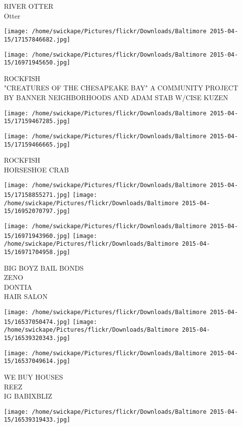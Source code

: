\documentclass[10pt,letterpaper]{article}
\begin{document}
RIVER OTTER\\
Otter
\pagebreak

\texttt{[image: /home/swickape/Pictures/flickr/Downloads/Baltimore 2015-04-15/17157846682.jpg]}

\vspace{0.25in}
\texttt{[image: /home/swickape/Pictures/flickr/Downloads/Baltimore 2015-04-15/16971945650.jpg]}

ROCKFISH\\
"CREATURES OF THE CHESAPEAKE BAY" A COMMUNITY PROJECT BY BANNER NEIGHBORHOODS AND ADAM STAB W/CISE KUZEN
\pagebreak

\texttt{[image: /home/swickape/Pictures/flickr/Downloads/Baltimore 2015-04-15/17159467285.jpg]}

\vspace{0.25in}
\texttt{[image: /home/swickape/Pictures/flickr/Downloads/Baltimore 2015-04-15/17159466665.jpg]}

ROCKFISH\\
HORSESHOE CRAB
\pagebreak

\texttt{[image: /home/swickape/Pictures/flickr/Downloads/Baltimore 2015-04-15/17158855271.jpg]}
\texttt{[image: /home/swickape/Pictures/flickr/Downloads/Baltimore 2015-04-15/16952070797.jpg]}

\texttt{[image: /home/swickape/Pictures/flickr/Downloads/Baltimore 2015-04-15/16971943960.jpg]}
\texttt{[image: /home/swickape/Pictures/flickr/Downloads/Baltimore 2015-04-15/16971704958.jpg]}

BIG BOYZ BAIL BONDS\\
ZENO\\
DONTIA\\
HAIR SALON
\pagebreak

\texttt{[image: /home/swickape/Pictures/flickr/Downloads/Baltimore 2015-04-15/16537050474.jpg]}
\texttt{[image: /home/swickape/Pictures/flickr/Downloads/Baltimore 2015-04-15/16539320343.jpg]}

\texttt{[image: /home/swickape/Pictures/flickr/Downloads/Baltimore 2015-04-15/16537049614.jpg]}

WE BUY HOUSES\\
REEZ\\
IG BABIXBLIZ
\pagebreak

\texttt{[image: /home/swickape/Pictures/flickr/Downloads/Baltimore 2015-04-15/16539319433.jpg]}
\end{document}
